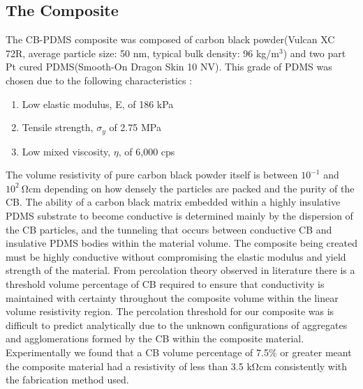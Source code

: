 \subsection*{The Composite}
The CB-PDMS composite was composed of carbon black powder(Vulcan XC 72R, average particle size: 50 nm, typical bulk density: 96 kg/m$^3$) and two part Pt cured PDMS(Smooth-On Dragon Skin 10 NV). This grade of PDMS was chosen due to the following characteristics \cite{SmoothOn2021}:
\begin{enumerate}
	\item Low elastic modulus, E, of 186 kPa
	\item Tensile strength, $\sigma_y$ of 2.75 MPa
	\item Low mixed viscosity, $\eta$, of 6,000 cps
\end{enumerate}
The volume resistivity of pure carbon black powder itself is between $10^{-1}$ and $10^2 \ \mathrm{\Omega cm}$ depending on how densely the particles are packed and the purity of the CB\cite{Spahr2017}. The ability of a carbon black matrix embedded within a highly insulative PDMS substrate to become conductive is determined mainly by the dispersion of the CB particles, and the tunneling that occurs between conductive CB and insulative PDMS bodies within the material volume\cite{Spahr2017,Wang2013}. The composite being created must be highly conductive without compromising the elastic modulus and yield strength of the material. From percolation theory observed in literature \cite{Spahr2017} there is a threshold volume percentage of CB required to ensure that conductivity is maintained with certainty throughout the composite volume within the linear volume resistivity region. The percolation threshold for our composite was is difficult to predict analytically due to the unknown configurations of aggregates and agglomerations formed by the CB within the composite material. Experimentally we found that a CB volume percentage of 7.5\% or greater meant the composite material had a resistivity of less than 3.5 $\mathrm{k\Omega cm}$ consistently with the fabrication method used.


